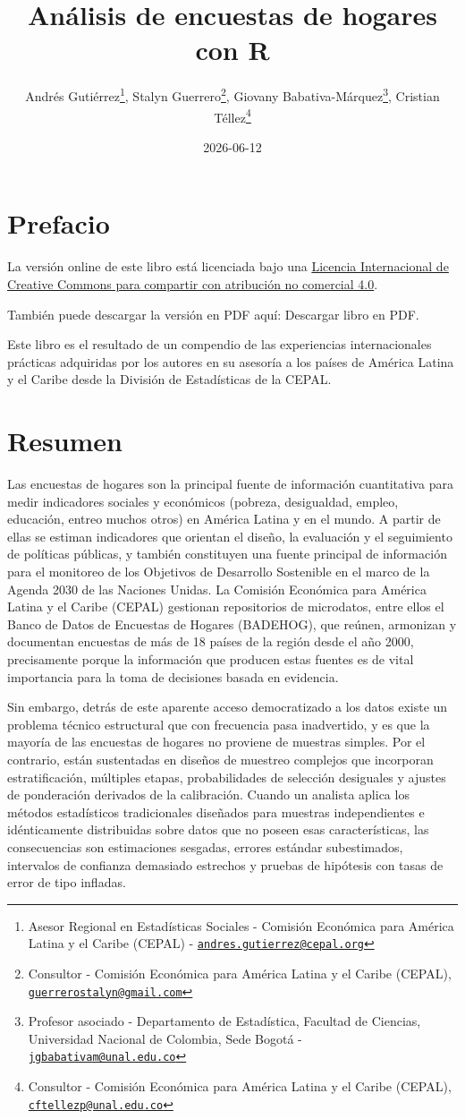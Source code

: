 \documentclass[
  spanish,
  12pt,
]{book}
\title{Análisis de encuestas de hogares con R}
\author{Andrés Gutiérrez\footnote{Asesor Regional en Estadísticas Sociales - Comisión Económica para América Latina y el Caribe (CEPAL) - \href{mailto:andres.gutierrez@cepal.org}{\nolinkurl{andres.gutierrez@cepal.org}}}, Stalyn Guerrero\footnote{Consultor - Comisión Económica para América Latina y el Caribe (CEPAL), \href{mailto:guerrerostalyn@gmail.com}{\nolinkurl{guerrerostalyn@gmail.com}}}, Giovany Babativa-Márquez\footnote{Profesor asociado - Departamento de Estadística, Facultad de Ciencias, Universidad Nacional de Colombia, Sede Bogotá - \href{mailto:jgbabativam@unal.edu.co}{\nolinkurl{jgbabativam@unal.edu.co}}}, Cristian Téllez\footnote{Consultor - Comisión Económica para América Latina y el Caribe (CEPAL), \href{mailto:cftellezp@unal.edu.co}{\nolinkurl{cftellezp@unal.edu.co}}}}
\date{2026-06-12}
\begin{document}
\maketitle

\renewcommand*\contentsname{Tabla de Contenido}
{
\hypersetup{linkcolor=}
\setcounter{tocdepth}{1}
\tableofcontents
}
\listoffigures
\listoftables
\chapter*{Prefacio}\label{prefacio}

La versión online de este libro está licenciada bajo una \href{http://creativecommons.org/licenses/by-nc-sa/4.0/}{Licencia Internacional de Creative Commons para compartir con atribución no comercial 4.0}.

También puede descargar la versión en PDF aquí:
Descargar libro en PDF.

Este libro es el resultado de un compendio de las experiencias internacionales prácticas adquiridas por los autores en su asesoría a los países de América Latina y el Caribe desde la División de Estadísticas de la CEPAL.

\chapter*{Resumen}\label{resumen}

Las encuestas de hogares son la principal fuente de información cuantitativa para medir indicadores sociales y económicos (pobreza, desigualdad, empleo, educación, entreo muchos otros) en América Latina y en el mundo. A partir de ellas se estiman indicadores que orientan el diseño, la evaluación y el seguimiento de políticas públicas, y también constituyen una fuente principal de información para el monitoreo de los Objetivos de Desarrollo Sostenible en el marco de la Agenda 2030 de las Naciones Unidas. La Comisión Económica para América Latina y el Caribe (CEPAL) gestionan repositorios de microdatos, entre ellos el Banco de Datos de Encuestas de Hogares (BADEHOG), que reúnen, armonizan y documentan encuestas de más de 18 países de la región desde el año 2000, precisamente porque la información que producen estas fuentes es de vital importancia para la toma de decisiones basada en evidencia.

Sin embargo, detrás de este aparente acceso democratizado a los datos existe un problema técnico estructural que con frecuencia pasa inadvertido, y es que la mayoría de las encuestas de hogares no proviene de muestras simples. Por el contrario, están sustentadas en diseños de muestreo complejos que incorporan estratificación, múltiples etapas, probabilidades de selección desiguales y ajustes de ponderación derivados de la calibración. Cuando un analista aplica los métodos estadísticos tradicionales diseñados para muestras independientes e idénticamente distribuidas sobre datos que no poseen esas características, las consecuencias son estimaciones sesgadas, errores estándar subestimados, intervalos de confianza demasiado estrechos y pruebas de hipótesis con tasas de error de tipo infladas.
\end{document}
